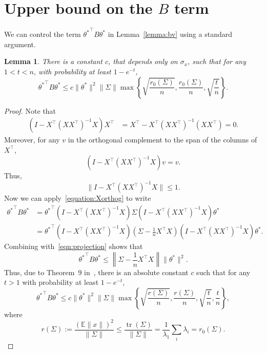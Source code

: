\documentclass[11pt,notitlepage]{article}
\newcommand\E {\mathbb{E}}
\newcommand\tr {\ensuremath{\operatorname{\mathrm{tr}}}}
\newtheorem{lemma}[theorem]{Lemma}
\begin{document}
\section{Upper bound on the $B$ term}\label{a:upperB}

We can control the term ${\theta^\ast}^\top B \theta^\ast$ in
Lemma~\ref{lemma:bv} using a standard argument.

\begin{lemma}\label{lemma:bias}
There is a constant $c$, that depends only on $\sigma_x$, such that for any $1<t<n$, with
probability at least $1-e^{-t}$,
  \[
    {\theta^\ast}^\top B \theta^\ast
        \leq c\|\theta^\ast\|^2\|\Sigma\|\max
        \left\{\sqrt{\frac{r_0(\Sigma)}{n}},
        \frac{r_0(\Sigma)}{n}, \sqrt{\frac{t}{n}} \right\}.
  \]
\end{lemma}

\begin{proof}
Note that
  \begin{align}\label{equation:Xorthog}
    \left(I - X^\top \left(X X^\top \right)^{-1}X\right)X^\top
    &= X^\top  - X^\top \left(X X^\top \right)^{-1}(XX^\top ) =0.
  \end{align}
Moreover, for any $v$ in the orthogonal complement to the span of
the columns of $X^\top$,
  \[
    \left(I - X^\top \left(X X^\top \right)^{-1}X\right)v = v.
  \]
Thus, 
  \begin{equation}\label{eqn:projection}
    \|I - X^\top \left(X X^\top \right)^{-1}X\|\leq 1.
  \end{equation}
Now we can apply~\eqref{equation:Xorthog} to write
  \begin{align*}
    {\theta^\ast}^\top B \theta^\ast
    & 
     = {\theta^\ast}^\top \left(I - X^\top
      \left(X X^\top \right)^{-1}X\right)\Sigma\left(I - X^\top
      \left(X X^\top \right)^{-1}X\right)\theta^\ast \\
    &= {\theta^\ast}^\top \left(I
      - X^\top \left(X X^\top \right)^{-1}X\right)\left(\Sigma -
      \frac1n X^\top X\right) 
        \left(I - X^\top
      \left(X X^\top \right)^{-1}X\right)\theta^\ast.
  \end{align*}
Combining with~\eqref{eqn:projection} shows that
  \[
    {\theta^\ast}^\top B \theta^\ast
    \leq \left\|\Sigma - \frac1n X^\top X\right\|\|\theta^\ast\|^2.
  \]
Thus, due to Theorem~9 in~\cite{koltchinskii2017},
there is an absolute constant $c$ such that for any $t > 1$  with
probability at least $1-e^{-t}$,
  \[
    {\theta^\ast}^\top B \theta^\ast
    \leq c\|\theta^\ast\|^2\|\Sigma\|\max\left\{\sqrt{\frac{r(\Sigma)}{n}},
      \frac{r(\Sigma)}{n}, \sqrt{\frac{t}{n}}, \frac{t}{n} \right\},
  \]
where 
  \[
    r(\Sigma) := \frac{(\E\|x\|)^2}{\|\Sigma\|}
    \leq \frac{\tr(\Sigma)}{\|\Sigma\|}
    = \frac{1}{\lambda_1}\sum_i \lambda_i = r_0(\Sigma).
  \]
\end{proof}
\end{document}

